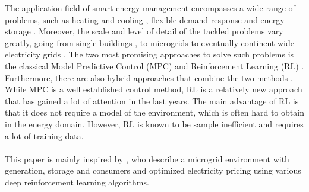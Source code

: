 The application field of smart energy management encompasses a wide range of problems, such as heating  and cooling \cite{Blum.2021}\cite{ThomasSchreiber.2020}, flexible demand response \cite{Jin.2021} and energy storage \cite{Nakabi.2021}. Moreover, the scale and level of detail of the tackled problems vary greatly, going from single buildings \cite{Blum.2021}, to microgrids \cite{Nakabi.2021} \cite{Castellanos.04.12.2022} to eventually continent wide electricity grids \cite{Horsch.2018}. The two most promising approaches to solve such problems is the classical Model Predictive Control (MPC) \cite{Basantes.2023} and Reinforcement Learning (RL) \cite{Nakabi.2021} \cite{Jin.2021} \cite{ThomasSchreiber.2020}\cite{Zhu.2022}. Furthermore, there are also hybrid approaches that combine the two methods \cite{JavierArroyo.2022}. While MPC is a well established control method, RL is a relatively new approach that has gained a lot of attention in the last years. The main advantage of RL is that it does not require a model of the environment, which is often hard to obtain in the energy domain. However, RL is known to be sample inefficient and requires a lot of training data. 
\\~\\
This paper is mainly inspired by \cite{Nakabi.2021}, who describe a microgrid environment with generation, storage and consumers and optimized electricity pricing
using various deep reinforcement learning algorithms.